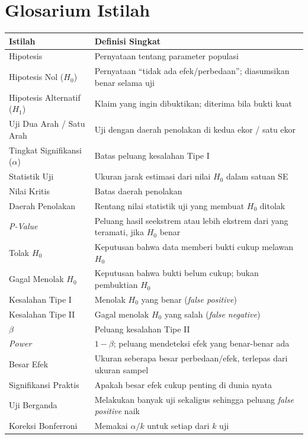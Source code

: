 \documentclass[
  indonesian,
  letterpaper,
]{book}
\newcounter{none} %
\begin{document}

\chapter{Glosarium Istilah}\label{glosarium-istilah-1}

{\def\LTcaptype{none} %
\begin{longtable}[]{@{}
  >{\raggedright\arraybackslash}p{}
  >{\raggedright\arraybackslash}p{}@{}}
\toprule\noalign{}
\begin{minipage}[b]{\linewidth}\raggedright
Istilah
\end{minipage} & \begin{minipage}[b]{\linewidth}\raggedright
Definisi Singkat
\end{minipage} \\
\midrule\noalign{}
\endhead
\bottomrule\noalign{}
\endlastfoot
Hipotesis & Pernyataan tentang parameter populasi \\
Hipotesis Nol (\(H_0\)) & Pernyataan ``tidak ada efek/perbedaan'';
diasumsikan benar selama uji \\
Hipotesis Alternatif (\(H_1\)) & Klaim yang ingin dibuktikan; diterima
bila bukti kuat \\
Uji Dua Arah / Satu Arah & Uji dengan daerah penolakan di kedua ekor /
satu ekor \\
Tingkat Signifikansi (\(\alpha\)) & Batas peluang kesalahan Tipe I \\
Statistik Uji & Ukuran jarak estimasi dari nilai \(H_0\) dalam satuan
SE \\
Nilai Kritis & Batas daerah penolakan \\
Daerah Penolakan & Rentang nilai statistik uji yang membuat \(H_0\)
ditolak \\
\emph{P-Value} & Peluang hasil seekstrem atau lebih ekstrem dari yang
teramati, jika \(H_0\) benar \\
Tolak \(H_0\) & Keputusan bahwa data memberi bukti cukup melawan
\(H_0\) \\
Gagal Menolak \(H_0\) & Keputusan bahwa bukti belum cukup; bukan
pembuktian \(H_0\) \\
Kesalahan Tipe I & Menolak \(H_0\) yang benar (\emph{false positive}) \\
Kesalahan Tipe II & Gagal menolak \(H_0\) yang salah (\emph{false
negative}) \\
\(\beta\) & Peluang kesalahan Tipe II \\
\emph{Power} & \(1-\beta\); peluang mendeteksi efek yang benar-benar
ada \\
Besar Efek & Ukuran seberapa besar perbedaan/efek, terlepas dari ukuran
sampel \\
Signifikansi Praktis & Apakah besar efek cukup penting di dunia nyata \\
Uji Berganda & Melakukan banyak uji sekaligus sehingga peluang
\emph{false positive} naik \\
Koreksi Bonferroni & Memakai \(\alpha/k\) untuk setiap dari \(k\) uji \\
\end{longtable}
}
\end{document}
